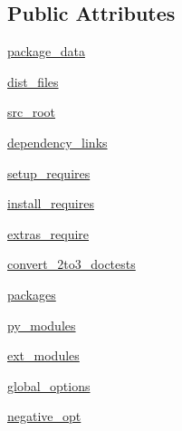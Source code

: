 \subsection*{Public Attributes}
\begin{DoxyCompactItemize}
\item 
\hyperlink{classsetuptools_1_1dist_1_1Distribution_a28ac7abd489dd4eb56729c1bd5fc4001}{package\+\_\+data}
\item 
\hyperlink{classsetuptools_1_1dist_1_1Distribution_a011b87bfd00e76d08afd8b7445b638f4}{dist\+\_\+files}
\item 
\hyperlink{classsetuptools_1_1dist_1_1Distribution_a95bf259f63af6e93f852a55ec8350442}{src\+\_\+root}
\item 
\hyperlink{classsetuptools_1_1dist_1_1Distribution_a25d14204a4135fe39d72e86271931405}{dependency\+\_\+links}
\item 
\hyperlink{classsetuptools_1_1dist_1_1Distribution_a9c92fcb644b34ca4ee8c9ee7e9d961da}{setup\+\_\+requires}
\item 
\hyperlink{classsetuptools_1_1dist_1_1Distribution_a945388170f24fc12a59ae5f4e369a669}{install\+\_\+requires}
\item 
\hyperlink{classsetuptools_1_1dist_1_1Distribution_af047fb9e8cc081d960c3d15d3c1b2b8c}{extras\+\_\+require}
\item 
\hyperlink{classsetuptools_1_1dist_1_1Distribution_a010211f65302ae1de90cbe365a87414f}{convert\+\_\+2to3\+\_\+doctests}
\item 
\hyperlink{classsetuptools_1_1dist_1_1Distribution_aafc4a8c489113cdd36b9362e7c580f77}{packages}
\item 
\hyperlink{classsetuptools_1_1dist_1_1Distribution_ac9c456efcd8abfa94a30b3d72ae14da3}{py\+\_\+modules}
\item 
\hyperlink{classsetuptools_1_1dist_1_1Distribution_a69973d886a01e916148145ef6e98709f}{ext\+\_\+modules}
\item 
\hyperlink{classsetuptools_1_1dist_1_1Distribution_a7e8da0c893e1686535bd5a75e05ec6af}{global\+\_\+options}
\item 
\hyperlink{classsetuptools_1_1dist_1_1Distribution_a3c0f94e256dad9ef7ea6dcedb2204f65}{negative\+\_\+opt}
\end{DoxyCompactItemize}


